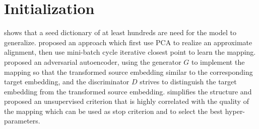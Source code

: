 \section{Initialization}
 \cite{vulic2016role} shows that a seed dictionary of at least hundreds are need for the model to generalize. \cite{DBLP:journals/corr/abs-1801-06126}
 proposed an approach which first use PCA to realize an approximate alignment, then use mini-batch cycle iterative closest point to learn the mapping.  
\cite{zhang2017adversarial} proposed an adversarial autoencoder, using the generator $G$ to implement the mapping so that the transformed source embedding similar to the corresponding target embedding, and the discriminator $D$ strives to distinguish the target embedding from the transformed source embedding. \cite{conneau2017word} simplifies the structure and proposed an unsupervised criterion that is highly correlated with the quality of the mapping which can be used as stop criterion and to select the best hyper-parameters.
%
%
%
%

